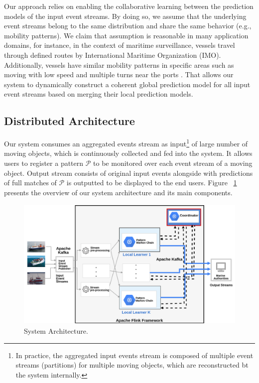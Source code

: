 \par Our approach relies on enabling the collaborative learning between the prediction models of  the input event streams. By doing so, we assume that the underlying event streams belong to the same  distribution and share the same behavior (e.g., mobility patterns). We claim that assumption is reasonable in many application domains, for instance, in the context of maritime surveillance, vessels travel through defined routes by International Maritime Organization (IMO). Additionally, vessels have similar mobility patterns in specific areas such as moving with low speed and multiple turns near the ports \cite{pallotta2013vessel,liu2014knowledge}. That allows our system to dynamically construct a coherent global prediction model for all input event streams based on merging their local prediction models.



\subsection{Distributed Architecture}
\label{sec:architecture}
Our system consumes an aggregated events stream as input\footnote{In practice, the aggregated input events stream is composed of multiple event streams (partitions) for multiple moving objects, which are reconstructed bt the system internally.} of large number of moving objects, which is continuously collected and fed into the system. It allows users to register a pattern $\mathcal{P}$ to be monitored over each event stream of a moving object. Output stream consists of original input events alongside with predictions of full matches of $\mathcal{P}$ is outputted to be displayed to the end users. Figure ~\ref{fig:architecture} presents the overview of our system architecture and its main components.      


\begin{figure}[h]

\includegraphics[height=2.5in, width=\linewidth]{figures/distributed_architecture.png}
	
\caption{System Architecture.}
\label{fig:architecture}
\end{figure}

